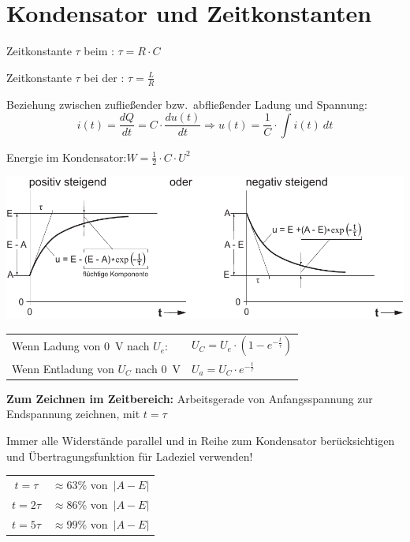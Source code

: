 \documentclass[a5paper, 12pt, twoside]{scrartcl}
\begin{document}
\vspace{1cm}

\section{Kondensator und Zeitkonstanten}

Zeitkonstante \(\tau\) beim : \dotfill \(\tau = R \cdot C\)

Zeitkonstante \(\tau\) bei der : \dotfill \(\tau = \frac{L}{R}\)

Beziehung zwischen zufließender bzw.\ abfließender Ladung und Spannung:
\[i(t) = \frac{dQ}{dt} = C \cdot \frac{du(t)}{dt} \Rightarrow u(t) = \frac{1}{C} \cdot \int i(t)\ dt\]

Energie im Kondensator:\dotfill\(W = \frac{1}{2} \cdot C \cdot U^2\)

\clearpage

{\centering
  \includegraphics[width=.7\textwidth]{LadekurveKondensator}
}

\begin{center}
  \begin{tabular}{ll}
    \toprule
    Wenn Ladung von \SI{0}{\volt} nach \(U_e\): & \(U_C = U_e \cdot (1 - e^{-\frac{t}{\tau}})\)\\
    Wenn Entladung von \(U_C\) nach \SI{0}{\volt} & \(U_a = U_C \cdot e^{-\frac{t}{\tau}}\)\\
    \bottomrule
  \end{tabular}
\end{center}

\textbf{Zum Zeichnen im Zeitbereich:} Arbeitsgerade von Anfangsspannung zur Endspannung zeichnen, mit \(t = \tau\)

 Immer alle Widerstände parallel und in Reihe zum Kondensator berücksichtigen und Übertragungsfunktion für Ladeziel verwenden!

\begin{table}[H]
  \centering
  \begin{tabular}{cc}
    \toprule
    \(t=\tau\) & \(\approx 63\%\) von\ \(|A-E|\)\\
    \(t=2\tau\) & \(\approx 86\%\) von\ \(|A-E|\)\\
    \(t=5\tau\) & \(\approx 99\%\) von\ \(|A-E|\)\\
    \bottomrule
  \end{tabular}
\end{table}
\end{document}
